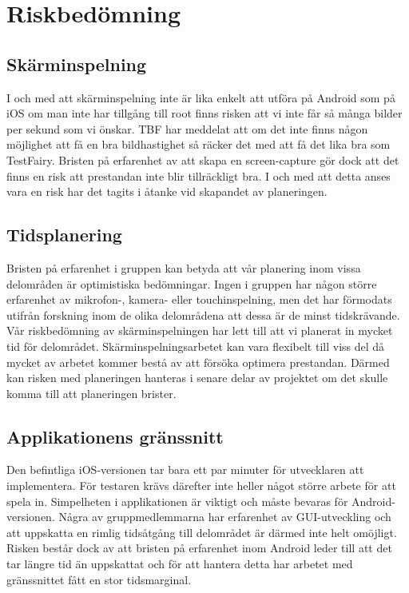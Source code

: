 \section{Riskbedömning}

\subsection{Skärminspelning}
\label{subsec:screenrec}
I och med att skärminspelning inte är lika enkelt att utföra på Android som på iOS om man inte har tillgång till root finns risken att vi inte får så många bilder per sekund som vi önskar. TBF har meddelat att om det inte finns någon möjlighet att få en bra bildhastighet så räcker det med att få det lika bra som TestFairy. Bristen på erfarenhet av att skapa en screen-capture gör dock att det finns en risk att prestandan inte blir tillräckligt bra. I och med att detta anses vara en risk har det tagits i åtanke vid skapandet av planeringen.

\subsection{Tidsplanering}
Bristen på erfarenhet i gruppen kan betyda att vår planering inom vissa delområden är optimistiska bedömningar. Ingen i gruppen har någon större erfarenhet av mikrofon-, kamera- eller touchinspelning, men det har förmodats utifrån forskning inom de olika delområdena att dessa är de minst tidskrävande. Vår riskbedömning av skärminspelningen har lett till att vi planerat in mycket tid för delområdet. Skärminspelningsarbetet kan vara flexibelt till viss del då mycket av arbetet kommer bestå av att försöka optimera prestandan. Därmed kan risken med planeringen hanteras i senare delar av projektet om det skulle komma till att planeringen brister.

\subsection{Applikationens gränssnitt}
Den befintliga iOS-versionen tar bara ett par minuter för utvecklaren att implementera. För testaren krävs därefter inte heller något större arbete för att spela in. Simpelheten i applikationen är viktigt och måste bevaras för Android-versionen. Några av gruppmedlemmarna har erfarenhet av GUI-utveckling och att uppskatta en rimlig tidsåtgång till delområdet är därmed inte helt omöjligt. Risken består dock av att bristen på erfarenhet inom Android leder till att det tar längre tid än uppskattat och för att hantera detta har arbetet med gränssnittet fått en stor tidsmarginal.
